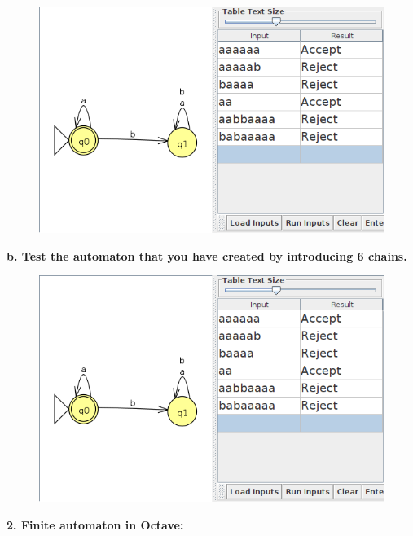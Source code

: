 \documentclass{article}
\begin{document}
\begin{figure}[htb]
    \centering
    \includegraphics[scale = 0.5]{DFA_Practica 2.png}
    \label{DFA_Practica 2.png}
\end{figure}

\vspace{6mm}

\RaggedRight
\textbf{b. Test the automaton that you have created by introducing 6 chains.}

\vspace{5mm}

\begin{figure}[htb]
    \centering
    \includegraphics[scale = 0.5]{DFA_Practica 2.png}
    \label{DFA_Practica 2.png}
\end{figure}

\newpage

\normalsize
\RaggedRight

\textbf{2. Finite automaton in Octave:}
\end{document}
